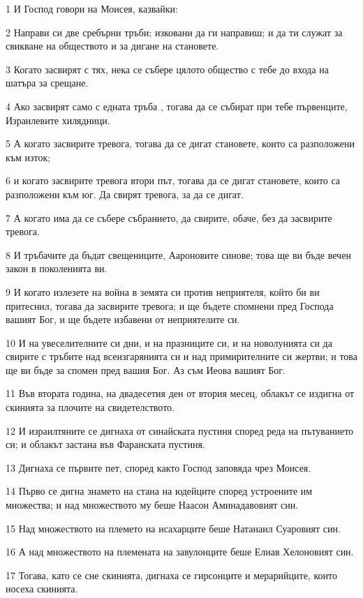 \par 1 И Господ говори на Моисея, казвайки:
\par 2 Направи си две сребърни тръби; изковани да ги направиш; и да ти служат за свикване на обществото и за дигане на становете.
\par 3 Когато засвирят с тях, нека се събере цялото общество с тебе до входа на шатъра за срещане.
\par 4 Ако засвирят само с едната тръба , тогава да се събират при тебе първенците, Израилевите хилядници.
\par 5 А когато засвирите тревога, тогава да се дигат становете, които са разположени към изток;
\par 6 и когато засвирите тревога втори път, тогава да се дигат становете, които са разположени към юг. Да свирят тревога, за да се дигат.
\par 7 А когато има да се събере събранието, да свирите, обаче, без да засвирите тревога.
\par 8 И тръбачите да бъдат свещениците, Аароновите синове; това ще ви бъде вечен закон в поколенията ви.
\par 9 И когато излезете на война в земята си против неприятеля, който би ви притеснил, тогава да засвирите тревога; и ще бъдете спомнени пред Господа вашият Бог, и ще бъдете избавени от неприятелите си.
\par 10 И на увеселителните си дни, и на празниците си, и на новолунията си да свирите с тръбите над всеизгарянията си и над примирителните си жертви; и това ще ви бъде за спомен пред вашия Бог. Аз съм Иеова вашият Бог.
\par 11 Във втората година, на двадесетия ден от втория месец, облакът се издигна от скинията за плочите на свидетелството.
\par 12 И израилтяните се дигнаха от синайската пустиня според реда на пътуванието си; и облакът застана във Фаранската пустиня.
\par 13 Дигнаха се първите пет, според както Господ заповяда чрез Моисея.
\par 14 Първо се дигна знамето на стана на юдейците според устроените им множества; и над множеството му беше Наасон Аминадавовият син.
\par 15 Над множеството на племето на исахарците беше Натанаил Суаровият син.
\par 16 А над множеството на племената на завулонците беше Елиав Хелоновият син.
\par 17 Тогава, като се сне скинията, дигнаха се гирсонците и мерарийците, които носеха скинията.
